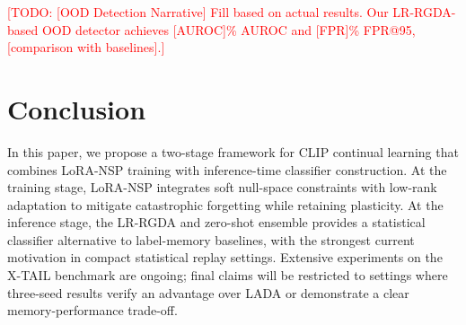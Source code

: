 \documentclass{article}
\newcommand{\todo}[1]{\textcolor{red}{[TODO: #1]}}
\begin{document}
\todo{[OOD Detection Narrative] Fill based on actual results. Our LR-RGDA-based OOD detector achieves [AUROC]\% AUROC and [FPR]\% FPR@95, [comparison with baselines].}
\fi

\section{Conclusion}
\label{sec:conclusion}

In this paper, we propose a two-stage framework for CLIP continual learning that combines LoRA-NSP training with inference-time classifier construction. At the training stage, LoRA-NSP integrates soft null-space constraints with low-rank adaptation to mitigate catastrophic forgetting while retaining plasticity. At the inference stage, the LR-RGDA and zero-shot ensemble provides a statistical classifier alternative to label-memory baselines, with the strongest current motivation in compact statistical replay settings. Extensive experiments on the X-TAIL benchmark are ongoing; final claims will be restricted to settings where three-seed results verify an advantage over LADA or demonstrate a clear memory-performance trade-off.
\end{document}
